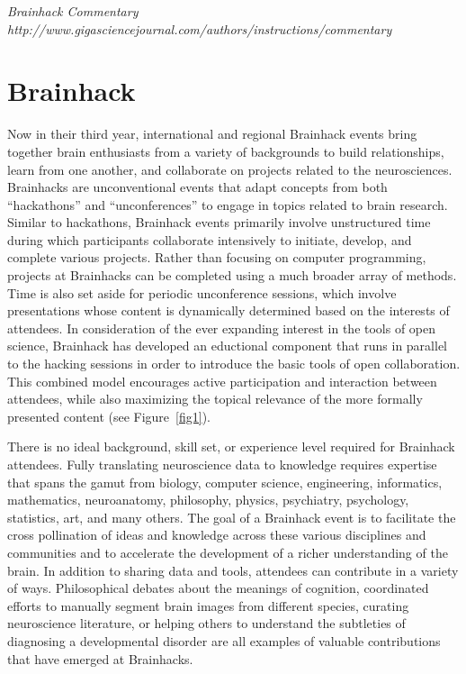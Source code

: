 \documentclass[11pt]{bmc_article_s50}
\begin{document}
\emph{Brainhack Commentary}
\emph{http://www.gigasciencejournal.com/authors/instructions/commentary}

\section{Brainhack}\label{brainhack}

Now in their third year, international and regional Brainhack events bring together brain enthusiasts from a variety of backgrounds to build relationships, learn from one another, and collaborate on projects related to the neurosciences. Brainhacks are unconventional events that adapt concepts from both ``hackathons'' and ``unconferences'' to engage in topics related to brain research. Similar to hackathons, Brainhack events primarily involve unstructured time during which participants collaborate intensively to initiate, develop, and complete various projects. Rather than focusing on computer programming, projects at Brainhacks can be completed using a much broader array of methods. Time is also set aside for periodic unconference sessions, which involve presentations whose content is dynamically determined based on the interests of attendees. In consideration of the ever expanding interest in the tools of open science, Brainhack has developed an eductional component that runs in parallel to the hacking sessions in order to introduce the basic tools of open collaboration. This combined model encourages active participation and interaction between attendees, while also maximizing the topical relevance of the more formally presented content (see Figure~\ref{fig1}).

There is no ideal background, skill set, or experience level required for Brainhack attendees. Fully translating neuroscience data to knowledge requires expertise that spans the gamut from biology, computer science, engineering, informatics, mathematics, neuroanatomy, philosophy, physics, psychiatry, psychology, statistics, art, and many others. The goal of a Brainhack event is to facilitate the cross pollination of ideas and knowledge across these various disciplines and communities and to accelerate the development of a richer understanding of the brain. In addition to sharing data and tools, attendees can contribute in a variety of ways. Philosophical debates about the meanings of cognition, coordinated efforts to manually segment brain images from different species, curating neuroscience literature, or helping others to understand the subtleties of diagnosing a developmental disorder are all examples of valuable contributions that have emerged at Brainhacks.
\end{document}
